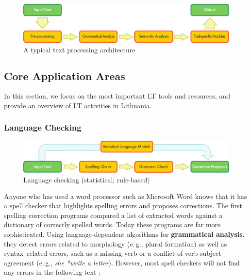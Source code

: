 \begin{multicols}{2}
\begin{figure}[htb]
  \center
  \includegraphics[width=\textwidth]{../_media/english/text_processing_app_architecture}
  \caption{A typical text processing architecture}
  \label{fig:textprocessingarch_en}
\end{figure}

\subsection{Core Application Areas}

In this section, we focus on the most important LT tools and resources, and provide an overview of LT activities in Lithuania. 

\subsubsection{Language Checking}

\begin{figure}[hb]
  \center
  \includegraphics[width=\textwidth]{../_media/english/language_checking}
  \caption{Language checking (statistical; rule-based)}
  \label{fig:langcheckingaarch_en}
\end{figure}

Anyone who has used a word processor such as Microsoft Word knows that it has a spell checker that highlights spelling errors and proposes corrections. The first spelling correction programs compared a list of extracted words against a dictionary of correctly spelled words. Today these programs are far more sophisticated. Using language-dependent algorithms for \textbf{grammatical analysis}, they detect errors related to morphology (e.\,g., plural formation) as well as syntax–related errors, such as a missing verb or a conflict of verb-subject agreement (e.\,g., \textit{she *write a letter}). However, most spell checkers will not find any errors in the following text \cite{zar1}:


\end{multicols}
